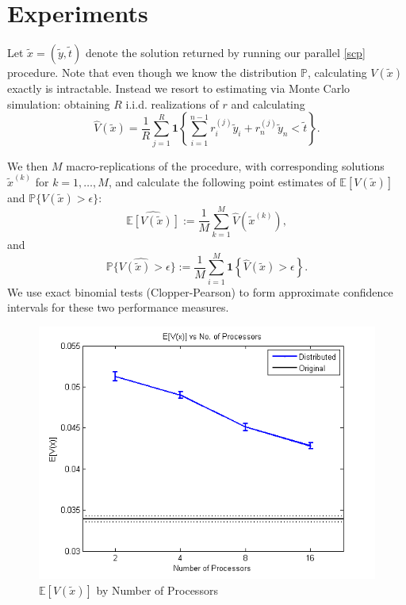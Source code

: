 \documentclass[12pt]{article}
\begin{document}
\section*{Experiments}
Let $\tilde{x} = (\tilde{y}, \tilde{t})$ denote the solution returned by running our parallel \ref{scp} procedure.
Note that even though we know the distribution $\mathbb{P}$, calculating $V(\tilde{x})$ exactly is intractable.
Instead we resort to estimating via Monte Carlo simulation: obtaining $R$ i.i.d. realizations of $r$ and calculating
\[ \hat{V}(\tilde{x}) = \frac{1}{R} \sum_{j = 1}^R \mathbf{1}\left\{ \sum_{i=1}^{n-1} r_i^{(j)} \tilde{y}_i + r_n^{(j)} \tilde{y}_n < \tilde{t}\right\}. \]

We then $M$ macro-replications of the procedure, with corresponding solutions $\tilde{x}^{(k)}$ for $k = 1, \ldots, M$, and calculate the following point estimates of $\mathbb{E}[V(\tilde{x})]$ and $\mathbb{P}\{V(\tilde{x}) > \epsilon\}$:
\[ \widehat{\mathbb{E}[V(\tilde{x})]} := \frac{1}{M} \sum_{k=1}^M \hat{V}(\tilde{x}^{(k)}), \]
and
\[ \widehat{\mathbb{P}\{V(\tilde{x}) > \epsilon\}} := \frac{1}{M} \sum_{i=1}^M \mathbf{1}\left\{\hat{V}(\tilde{x}) > \epsilon\right\}. \]
We use exact binomial tests (Clopper-Pearson) to form approximate confidence intervals for these two performance measures.

%

\begin{figure}[ht]
	\centering
		\includegraphics{../plot/figs/expviolprob_numproc.png}
	\caption{$\mathbb{E}[V(\tilde{x})]$ by Number of Processors}
	\label{fig:expviolprob_numproc}
\end{figure}
\end{document}
